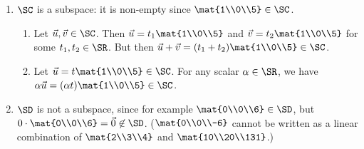 \begin{exercises}
\begin{problist}
\begin{solution}
\begin{enumerate}
				\item $\SC$ is a subspace: it is non-empty since $\mat{1\\0\\5}\in\SC$. 
				\begin{enumerate}
					\item Let $\vec u,\vec v\in \SC$. Then $\vec u=t_1\mat{1\\0\\5}$ and $\vec v=t_2\mat{1\\0\\5}$ for some $t_1,t_2\in\SR$. But then $\vec u+\vec v=(t_1+t_2)\mat{1\\0\\5}\in \SC$.

					\item Let $\vec u=t\mat{1\\0\\5}\in\SC$. For any scalar $\alpha\in\SR$, we have $\alpha\vec u=(\alpha t)\mat{1\\0\\5}\in\SC$.
				\end{enumerate}

				\item $\SD$ is not a subspace, since for example $\mat{0\\0\\6}\in\SD$, but $0\cdot\mat{0\\0\\6}=\vec 0\not\in\SD$. ($\mat{0\\0\\-6}$ cannot be written as a linear combination of $\mat{2\\3\\4}$ and $\mat{10\\20\\131}$.)


\end{enumerate}
\end{solution}
\end{problist}
\end{exercises}
